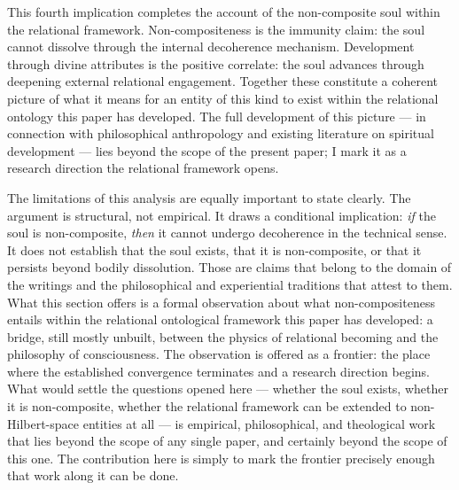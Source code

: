 This fourth implication completes the account of the non-composite soul
within the relational framework.
Non-compositeness is the immunity claim: the soul cannot dissolve through
the internal decoherence mechanism.
Development through divine attributes is the positive correlate: the soul
advances through deepening external relational engagement.
Together these constitute a coherent picture of what it means for an entity
of this kind to exist within the relational ontology this paper has developed.
The full development of this picture --- in connection with \bahai philosophical
anthropology and existing literature on spiritual development --- lies beyond
the scope of the present paper; I mark it as a research direction the
relational framework opens.

The limitations of this analysis are equally important to state clearly.
The argument is structural, not empirical.
It draws a conditional implication: \emph{if} the soul is non-composite,
\emph{then} it cannot undergo decoherence in the technical sense.
It does not establish that the soul exists, that it is non-composite,
or that it persists beyond bodily dissolution.
Those are claims that belong to the domain of the \bahai writings and the
philosophical and experiential traditions that attest to them.
What this section offers is a formal observation about what non-compositeness
entails within the relational ontological framework this paper has developed:
a bridge, still mostly unbuilt, between the physics of relational becoming
and the philosophy of consciousness.
The observation is offered as a frontier: the place where the established
convergence terminates and a research direction begins.
What would settle the questions opened here --- whether the soul exists,
whether it is non-composite, whether the relational framework can be
extended to non-Hilbert-space entities at all --- is empirical,
philosophical, and theological work that lies beyond the scope of any
single paper, and certainly beyond the scope of this one.
The contribution here is simply to mark the frontier precisely enough
that work along it can be done.
